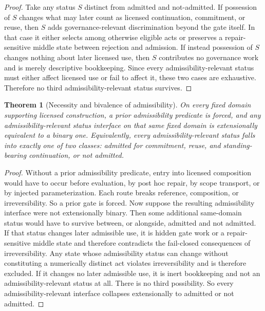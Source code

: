 \documentclass[11pt]{article}
\newtheorem{theorem}{Theorem}[section]
\theoremstyle{definition}
\theoremstyle{remark}
\begin{document}
\begin{proof}
Take any status $S$ distinct from admitted and not-admitted. If possession of $S$ changes what may later count as licensed continuation, commitment, or reuse, then $S$ adds governance-relevant discrimination beyond the gate itself. In that case it either selects among otherwise eligible acts or preserves a repair-sensitive middle state between rejection and admission. If instead possession of $S$ changes nothing about later licensed use, then $S$ contributes no governance work and is merely descriptive bookkeeping. Since every admissibility-relevant status must either affect licensed use or fail to affect it, these two cases are exhaustive. Therefore no third admissibility-relevant status survives.
\end{proof}

\begin{theorem}[Necessity and bivalence of admissibility]\label{thm:bivalence}
On every fixed domain supporting licensed construction, a prior admissibility predicate is forced, and any admissibility-relevant status interface on that same fixed domain is extensionally equivalent to a binary one. Equivalently, every admissibility-relevant status falls into exactly one of two classes: admitted for commitment, reuse, and standing-bearing continuation, or not admitted.
\end{theorem}

\begin{proof}
Without a prior admissibility predicate, entry into licensed composition would have to occur before evaluation, by post hoc repair, by scope transport, or by injected parameterization. Each route breaks reference, composition, or irreversibility. So a prior gate is forced. Now suppose the resulting admissibility interface were not extensionally binary. Then some additional same-domain status would have to survive between, or alongside, admitted and not admitted. If that status changes later admissible use, it is hidden gate work or a repair-sensitive middle state and therefore contradicts the fail-closed consequences of irreversibility. Any state whose admissibility status can change without constituting a numerically distinct act violates irreversibility and is therefore excluded. If it changes no later admissible use, it is inert bookkeeping and not an admissibility-relevant status at all. There is no third possibility. So every admissibility-relevant interface collapses extensionally to admitted or not admitted.
\end{proof}
\end{document}

